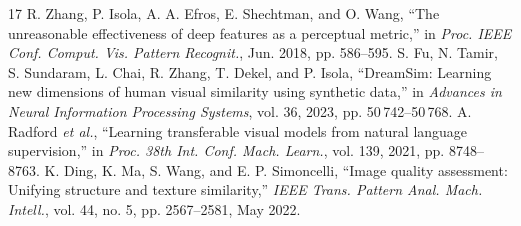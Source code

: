 \begin{thebibliography}{17}
 R. Zhang, P. Isola, A. A. Efros, E. Shechtman, and O. Wang, ``The unreasonable effectiveness of deep features as a perceptual metric,'' in \emph{Proc. IEEE Conf. Comput. Vis. Pattern Recognit.}, Jun. 2018, pp. 586--595.
 S. Fu, N. Tamir, S. Sundaram, L. Chai, R. Zhang, T. Dekel, and P. Isola, ``DreamSim: Learning new dimensions of human visual similarity using synthetic data,'' in \emph{Advances in Neural Information Processing Systems}, vol. 36, 2023, pp. 50\,742--50\,768.
 A. Radford \emph{et al.}, ``Learning transferable visual models from natural language supervision,'' in \emph{Proc. 38th Int. Conf. Mach. Learn.}, vol. 139, 2021, pp. 8748--8763.
 K. Ding, K. Ma, S. Wang, and E. P. Simoncelli, ``Image quality assessment: Unifying structure and texture similarity,'' \emph{IEEE Trans. Pattern Anal. Mach. Intell.}, vol. 44, no. 5, pp. 2567--2581, May 2022.
\end{thebibliography}
